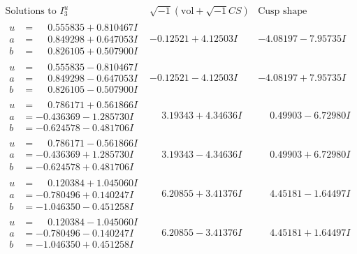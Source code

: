 \documentclass[1p]{elsarticle_modified}
\theoremstyle{definition}
\newcommand{\I}{\sqrt{-1}}
\begin{document}
$$\begin{array}{c|c|c}  
\text{Solutions to }I^u_{3}& \I (\text{vol} + \sqrt{-1}CS) & \text{Cusp shape}\\
 \hline 
\begin{aligned}
u &= \phantom{-}0.555835 + 0.810467 I \\
a &= \phantom{-}0.849298 + 0.647053 I \\
b &= \phantom{-}0.826105 + 0.507900 I\end{aligned}
 & -0.12521 + 4.12503 I & -4.08197 - 7.95735 I \\ \hline\begin{aligned}
u &= \phantom{-}0.555835 - 0.810467 I \\
a &= \phantom{-}0.849298 - 0.647053 I \\
b &= \phantom{-}0.826105 - 0.507900 I\end{aligned}
 & -0.12521 - 4.12503 I & -4.08197 + 7.95735 I \\ \hline\begin{aligned}
u &= \phantom{-}0.786171 + 0.561866 I \\
a &= -0.436369 - 1.285730 I \\
b &= -0.624578 - 0.481706 I\end{aligned}
 & \phantom{-}3.19343 + 4.34636 I & \phantom{-}0.49903 - 6.72980 I \\ \hline\begin{aligned}
u &= \phantom{-}0.786171 - 0.561866 I \\
a &= -0.436369 + 1.285730 I \\
b &= -0.624578 + 0.481706 I\end{aligned}
 & \phantom{-}3.19343 - 4.34636 I & \phantom{-}0.49903 + 6.72980 I \\ \hline\begin{aligned}
u &= \phantom{-}0.120384 + 1.045060 I \\
a &= -0.780496 + 0.140247 I \\
b &= -1.046350 - 0.451258 I\end{aligned}
 & \phantom{-}6.20855 + 3.41376 I & \phantom{-}4.45181 - 1.64497 I \\ \hline\begin{aligned}
u &= \phantom{-}0.120384 - 1.045060 I \\
a &= -0.780496 - 0.140247 I \\
b &= -1.046350 + 0.451258 I\end{aligned}
 & \phantom{-}6.20855 - 3.41376 I & \phantom{-}4.45181 + 1.64497 I \\ \hline\begin{aligned}

\end{aligned}
\end{array}$$
\end{document}
